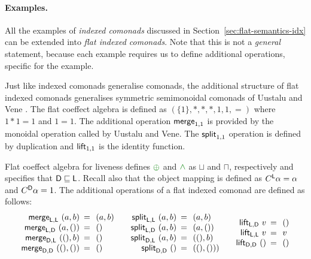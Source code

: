 \paragraph{Examples.}
All the examples of \emph{indexed comonads} discussed in Section~\ref{sec:flat-semantics-idx} can
be extended into \emph{flat indexed comonads}. Note that this is not a \emph{general} statement, 
because each example requires us to define additional operations, specific for the example.

\begin{example}
Just like indexed comonads generalise co\-monads, the additional structure of
flat indexed comonads generalises symmetric semimonoidal comonads of Uustalu 
and Vene \cite{comonads-notions}. The flat coeffect algebra is defined as $(\{1\}, \ast, \ast, \ast, 1, 1, =)$
where $1\ast1=1$ and $1=1$. The additional operation $\textnormal{\sffamily merge}_{1,1}$ is provided by the 
monoidal operation called  by Uustalu and Vene. The $\textnormal{\sffamily split}_{1,1}$ operation 
is defined by duplication and $\textnormal{\sffamily lift}_{1,1}$ is the identity function.
\end{example}

\begin{example}
Flat coeffect algebra for liveness defines $\cpar$ and $\czip$ as $\sqcup$ and $\sqcap$, respectively 
and specifies that $\textnormal{\sffamily D} \sqsubseteq \textnormal{\sffamily L}$. Recall also that the object mapping is defined 
as $C^{\textnormal{\sffamily L}}\alpha = \alpha$ and $C^{\textnormal{\sffamily D}}\alpha = 1$. The additional operations 
of a flat indexed comonad are defined as follows:
%
\begin{equation*}
\begin{array}{rcl}
\ident{merge}_{\ident{L}, \ident{L}}~(a, b) &\narrow{=}& (a, b)\\
\ident{merge}_{\ident{L}, \ident{D}}~(a, ()) &\narrow{=}& ()\\
\ident{merge}_{\ident{D}, \ident{L}}~((), b) &\narrow{=}& ()\\
\ident{merge}_{\ident{D}, \ident{D}}~((), ()) &\narrow{=}& ()\\
\end{array}
\quad
\begin{array}{rcl}
\ident{split}_{\ident{L}, \ident{L}}~(a, b) &\narrow{=}& (a, b)\\
\ident{split}_{\ident{L}, \ident{D}}~(a, b) &\narrow{=}& (a, ())\\
\ident{split}_{\ident{D}, \ident{L}}~(a, b) &\narrow{=}& ((), b)\\
\ident{split}_{\ident{D}, \ident{D}}~() &\narrow{=}& ((), ()))\\
\end{array}
\quad
\begin{array}{rcl}
\ident{lift}_{\ident{L}, \ident{D}}~v &\narrow{=}& ()\\
\ident{lift}_{\ident{L}, \ident{L}}~v &\narrow{=}& v\\
\ident{lift}_{\ident{D}, \ident{D}}~() &\narrow{=}& ()\\
\end{array}
\end{equation*}
\end{example}

